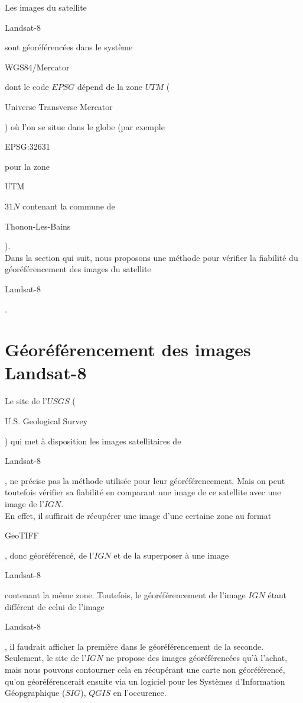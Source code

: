 \documentclass{book}
\begin{document}
Les images du satellite \begin{itshape}Landsat-8\end{itshape} sont géoréférencées dans le système 
\begin{itshape}WGS84/Mercator\end{itshape} dont le code $EPSG$ dépend
de la zone $UTM$ (\begin{itshape}Universe Transverse Mercator\end{itshape}) où l'on se situe dans le globe 
(par exemple \begin{itshape}EPSG:32631\end{itshape} pour la zone \begin{itshape}UTM\end{itshape} $31N$ contenant la commune de
 \begin{itshape}Thonon-Les-Bains\end{itshape}).\\ 
Dans la section qui suit, nous proposons une méthode pour vérifier la fiabilité du géoréférencement
 des images du satellite \begin{itshape}Landsat-8\end{itshape}.
 
\section{Géoréférencement des images Landsat-8}

Le site de l'$USGS$ (\begin{itshape}U.S. Geological Survey\end{itshape}) \cite{landsat8} qui met à disposition les images
satellitaires de \begin{itshape}Landsat-8\end{itshape}, ne précise pas la méthode utilisée pour leur géoréférencement.
Mais on peut toutefois vérifier sa fiabilité en comparant une image de ce satellite avec une image de 
l'$IGN$.\\
En effet, il suffirait de récupérer une image d'une certaine zone au format \begin{itshape}GeoTIFF\end{itshape}, 
donc géoréférencé, de l'$IGN$ et de la superposer
à une image \begin{itshape}Landsat-8\end{itshape} contenant la même zone. Toutefois, le géoréférencement de l'image $IGN$ étant différent
de celui de l'image \begin{itshape}Landsat-8\end{itshape}, il faudrait afficher la première dans le géoréférencement de la seconde.\\
Seulement, le site de l'$IGN$ ne propose des images géoréférencées qu'à l'achat, mais nous pouvons contourner cela en récupérant une 
carte non géoréférencé, qu'on géoréférencerait ensuite via un logiciel pour les Systèmes d'Information Géopgraphique ($SIG$), 
$QGIS$ en l'occurence.
\end{document}
